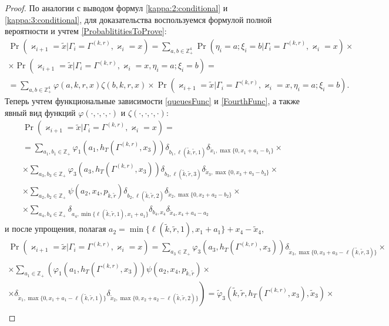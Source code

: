 \documentclass[a4paper,12pt,russian]{extarticle}
\newcommand{\mll}[1]{\begin{multline*}#1\end{multline*}}
\begin{document}
\begin{proof}
По аналогии с выводом формул \eqref{kappa:2:conditional} и \eqref{kappa:3:conditional}, для доказательства воспользуемся формулой полной вероятности и учтем \eqref{ProbablititiesToProve}:
\mll
{
\Pr (\varkappa_{i+1}=\tilde{x}|\Gamma_{i}=\Gamma^{(k,r)},\varkappa_i=x)= \sum_{a,b \in \mathbb{Z}_+^4} \Pr (\eta_i=a; \xi_i=b|\Gamma_{i}=\Gamma^{(k,r)},\varkappa_i=x) \times \\ 
\times
\Pr (\varkappa_{i+1}=\tilde{x}|\Gamma_{i}=\Gamma^{(k,r)},\varkappa_i=x, \eta_i=a; \xi_i=b) = \\
=\sum_{a,b \in \mathbb{Z}_+^4} \varphi(a,k,r,x) \zeta(b,k,r,x)
\times
\Pr (\varkappa_{i+1}=\tilde{x}|\Gamma_{i}=\Gamma^{(k,r)},\varkappa_i=x, \eta_i=a; \xi_i=b).
}
Теперь учтем функциональные зависимости \eqref{queuesFunc} и \eqref{FourthFunc}, а также явный вид функций $\varphi(\cdot, \cdot, \cdot, \cdot)$ и $\zeta(\cdot, \cdot, \cdot, \cdot)$:
\mll
{
\Pr (\varkappa_{i+1}=\tilde{x}|\Gamma_{i}=\Gamma^{(k,r)},\varkappa_i=x)= \\
=\sum_{a_1,b_1 \in \mathbb{Z}_+} \varphi_1(a_1,h_T(\Gamma^{(k,r)},x_3)) \delta_{b_1,\ell(\tilde{k},\tilde{r},1)} \delta_{\tilde{x}_1,\max{\{0,x_1+a_1-b_1\}}} \times \\
\times \sum_{a_3,b_3 \in \mathbb{Z}_+}  \varphi_3(a_3,h_T(\Gamma^{(k,r)},x_3)) \delta_{b_3,\ell(\tilde{k},\tilde{r},3)}  \delta_{\tilde{x}_3,\max{\{0,x_3+a_3-b_3\}}} \times \\
\times \sum_{a_2,b_2 \in \mathbb{Z}_+}  \psi(a_2,x_4, p_{\tilde{k},\tilde{r}})   \delta_{b_2,\ell(\tilde{k},\tilde{r},2)}   \delta_{\tilde{x}_2,\max{\{0,x_2+a_2-b_2\}}} \times \\
\times \sum_{a_4,b_4 \in \mathbb{Z}_+}  \delta_{a_4,\min{\{\ell(\tilde{k},\tilde{r},1), x_1+a_1}\}}   \delta_{b_4,x_4} \delta_{\tilde{x}_4,x_4+a_4-a_2} 
}
и после упрощения, полагая $a_2 = \min{\{\ell(\tilde{k},\tilde{r},1), x_1+a_1}\} +x_4-\tilde{x}_4$,
\mll
{
\Pr (\varkappa_{i+1}=\tilde{x}|\Gamma_{i}=\Gamma^{(k,r)},\varkappa_i=x)=\sum_{a_3\in \mathbb{Z}_+}  \varphi_3(a_3,h_T(\Gamma^{(k,r)},x_3))  \delta_{\tilde{x}_3,\max{\{0,x_3+a_3-\ell(\tilde{k},\tilde{r},3)\}}} \times \\
\times\sum_{a_1 \in \mathbb{Z}_+} \left( \varphi_1(a_1,h_T(\Gamma^{(k,r)},x_3))  \psi(a_2,x_4, p_{\tilde{k},\tilde{r}}) \times \right. \\
\left. \times \delta_{\tilde{x}_1,\max{\{0,x_1+a_1-\ell(\tilde{k},\tilde{r},1)\}}}  \delta_{\tilde{x}_2,\max{\{0,x_2+a_2-\ell(\tilde{k},\tilde{r},2)\}}} \right)
=\tilde{\varphi}_3(\tilde{k},\tilde{r},h_T(\Gamma^{(k,r)},x_3),\tilde{x}_3) \times\\
}
\end{proof}
\end{document}
